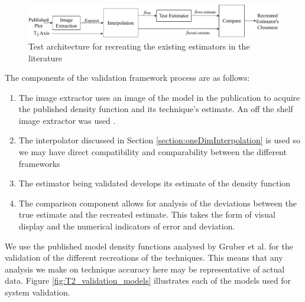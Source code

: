 \begin{figure}[h]
    \centering
    \includegraphics[width=\textwidth]{implementation/ValidateRecreatedModels.pdf}
    \caption{Test architecture for recreating the existing estimators in the literature}
    \label{fig:validate_recreated_models}
\end{figure}

The components of the validation framework process are as follows:

\begin{enumerate}
    \item The image extractor uses an image of the model in the publication to acquire the published density function and its technique's estimate. An off the shelf image extractor was used \cite{webplotdigitizer}.
    \item The interpolator discussed in Section \ref{section:oneDimInterpolation} is used so we may have direct compatibility and comparability between the different frameworks
    \item The estimator being validated develops its estimate of the density function
    \item The comparison component allows for analysis of the deviations between the true estimate and the recreated estimate. This takes the form of visual display and the numerical indicators of error and deviation.
\end{enumerate}

We use the published model density functions analysed by Gruber et al. \cite{GruberT2Estimation2013} for the validation of the different recreations of the techniques. This means that any analysis we make on technique accuracy here may be representative of actual data. Figure \ref{fig:T2_validation_models} illustrates each of the models used for system validation.

